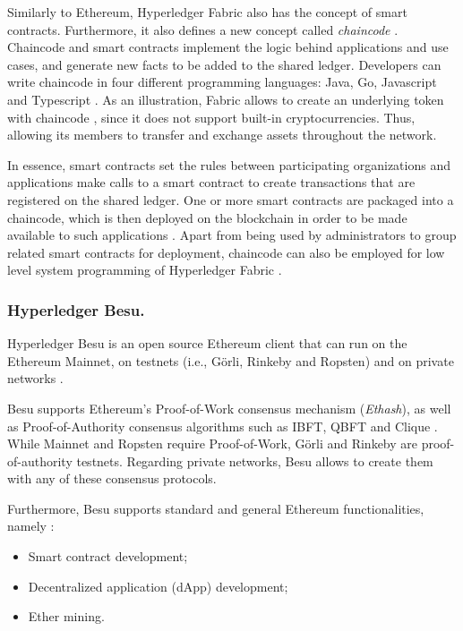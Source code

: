 \documentclass[runningheads]{llncs}
\begin{document}
Similarly to Ethereum, Hyperledger Fabric also has the concept of smart contracts. Furthermore, it also defines a new concept called \textit{chaincode} \cite{fabric}. Chaincode and smart contracts implement the logic behind applications and use cases, and generate new facts to be added to the shared ledger. Developers can write chaincode in four different programming languages: Java, Go, Javascript and Typescript \cite{abrunhosa_2021}. As an illustration, Fabric allows to create an underlying token with chaincode \cite{hyperledgerlabs}, since it does not support built-in cryptocurrencies. Thus, allowing its members to transfer and exchange assets throughout the network.

In essence, smart contracts set the rules between participating organizations and applications make calls to a smart contract to create transactions that are registered on the shared ledger. One or more smart contracts are packaged into a chaincode, which is then deployed on the blockchain in order to be made available to such applications \cite{fabric}. Apart from being used by administrators to group related smart contracts for deployment, chaincode can also be employed for low level system programming of Hyperledger Fabric \cite{fabric}.


\subsubsection{Hyperledger Besu.} Hyperledger Besu is an open source Ethereum client that can run on the Ethereum Mainnet, on testnets (i.e., Görli, Rinkeby and Ropsten) and on private networks \cite{abrunhosa_2021}.

Besu supports Ethereum's Proof-of-Work consensus mechanism (\textit{Ethash}), as well as Proof-of-Authority consensus algorithms such as IBFT, QBFT and Clique \cite{besu}. While Mainnet and Ropsten require Proof-of-Work, Görli and Rinkeby are proof-of-authority testnets. Regarding private networks, Besu allows to create them with any of these consensus protocols.

Furthermore, Besu supports standard and general Ethereum functionalities, namely \cite{besu}:
\begin{itemize}
    \item Smart contract development;
    \item Decentralized application (dApp) development;
    \item Ether mining.
\end{itemize}
\end{document}
